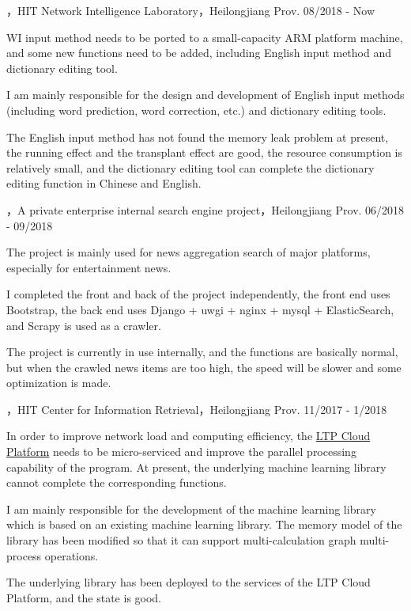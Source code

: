 
\begin{cventries}

\cvexperience
{，HIT Network Intelligence Laboratory，Heilongjiang Prov.}
{08/2018 - Now}
{
    \begin{cvitems}
    \item {WI input method needs to be ported to a small-capacity ARM platform machine, and some new functions need to be added, including English input method and dictionary editing tool.}
    \item {I am mainly responsible for the design and development of English input methods (including word prediction, word correction, etc.) and dictionary editing tools.}
    \item {The English input method has not found the memory leak problem at present, the running effect and the transplant effect are good, the resource consumption is relatively small, and the dictionary editing tool can complete the dictionary editing function in Chinese and English.}
    \end{cvitems}
}

\cvexperience
{，A private enterprise internal search engine project，Heilongjiang Prov.}
{06/2018 - 09/2018}
{
    \begin{cvitems}
    \item {The project is mainly used for news aggregation search of major platforms, especially for entertainment news.}
    \item {I completed the front and back of the project independently, the front end uses Bootstrap, the back end uses Django + uwgi + nginx + mysql + ElasticSearch, and Scrapy is used as a crawler.}
    \item {The project is currently in use internally, and the functions are basically normal, but when the crawled news items are too high, the speed will be slower and some optimization is made.}
    \end{cvitems}
}

\cvexperience
{，HIT Center for Information Retrieval，Heilongjiang Prov.}
{11/2017 - 1/2018}
{
    \begin{cvitems}
    \item {In order to improve network load and computing efficiency, the \href{https://www.ltp-cloud.com/}{LTP Cloud Platform} needs to be micro-serviced and improve the parallel processing capability of the program. At present, the underlying machine learning library cannot complete the corresponding functions.}
    \item {I am mainly responsible for the development of the machine learning library which is based on an existing machine learning library. The memory model of the library has been modified so that it can support multi-calculation graph multi-process operations.}
    \item {The underlying library has been deployed to the services of the LTP Cloud Platform, and the state is good.}
    \end{cvitems}
}

\end{cventries}